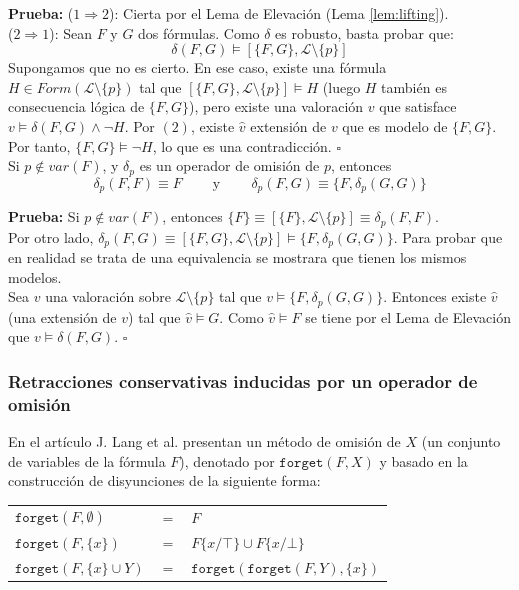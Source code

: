\noindent \textbf{Prueba:} ($1 \Rightarrow 2$): Cierta por el Lema de Elevación (Lema \ref{lem:lifting}).\\
($2 \Rightarrow 1$): Sean $F$ y $G$ dos fórmulas. Como $\delta$ es robusto, basta probar que:
$$\delta (F,G) \vDash [\{ F,G \}, \mathcal{L} \setminus \{ p \}]$$
Supongamos que no es cierto. En ese caso, existe una fórmula $H \in Form(\mathcal{L} \setminus \{ p \})$ tal que $[\{ F,G \}, \mathcal{L} \setminus \{ p \}] \vDash H$ (luego $H$ también es consecuencia lógica de $\{ F,G \}$), pero existe una valoración $v$ que satisface $v \vDash \delta (F,G) \wedge \neg H$. Por $(2)$, existe $\hat{v}$ extensión de $v$ que es modelo de $\{ F,G \}$. Por tanto, $\{ F,G \} \vDash \neg H$, lo que es una contradicción. \hspace{7.7cm} $\square$ \\

\cor Si $p \notin var(F)$, y $\delta_p$ es un operador de omisión de $p$, entonces
$$\delta_p(F,F) \equiv F \;\;\;\;\;\;\;\; \text{y} \;\;\;\;\;\;\;\; \delta_p (F,G) \equiv \{ F,\delta_p (G,G) \}$$

\noindent \label{cor:pnotinvar} \textbf{Prueba:} Si $p \notin var(F)$, entonces $\{ F \} \equiv [\{ F \} ,\mathcal{L} \setminus \{ p \}] \equiv \delta_p (F,F)$.\\
Por otro lado, $\delta_p (F,G) \equiv [\{ F,G \} , \mathcal{L} \setminus \{ p \}] \vDash \{ F,\delta_p (G,G) \}$. Para probar que en realidad se trata de una equivalencia se mostrara que tienen los mismos modelos.\\
Sea $v$ una valoración sobre $\mathcal{L} \setminus \{ p \}$ tal que $v \vDash \{ F,\delta_p (G,G) \}$. Entonces existe $\hat{v}$ (una extensión de $v$) tal que $\hat{v} \vDash G$. Como $\hat{v} \vDash F$ se tiene por el Lema de Elevación que $v \vDash \delta (F,G)$. \hspace{14cm} $\square$ 
 
\subsubsection{Retracciones conservativas inducidas por un operador de omisión} 
 
En el artículo \cite{Lang2003} J. Lang et al.  presentan un método de omisión de $X$ (un conjunto de variables de la fórmula $F$), denotado por $\texttt{forget}(F,X)$ y basado en la construcción de disyunciones de la siguiente forma:\\

\begin{tabular}{lll}
$\texttt{forget}(F, \emptyset)$ & $=$ & $F$\\
$\texttt{forget}(F, \{ x \})$ & $= $ & $F\{x/\top \} \cup F\{x/\bot \}$ \\
$\texttt{forget}(F, \{ x \} \cup Y)$ & $= $ & $\texttt{forget} (\texttt{forget}(F,Y),\{ x \})$
\end{tabular}

